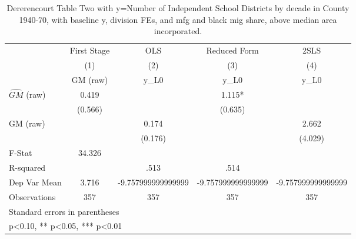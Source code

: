 \begin{table}[htbp]\centering
\def\sym#1{\ifmmode^{#1}\else\(^{#1}\)\fi}
\caption{Dererencourt Table Two with y=Number of Independent School Districts by decade in County 1940-70, with baseline y, division FEs, and mfg and black mig share, above median area incorporated.}
\begin{tabular}{l*{4}{c}}
\toprule
                    & First Stage   &         OLS   &Reduced Form   &        2SLS   \\
                    &\multicolumn{1}{c}{(1)}&\multicolumn{1}{c}{(2)}&\multicolumn{1}{c}{(3)}&\multicolumn{1}{c}{(4)}\\
                    &\multicolumn{1}{c}{GM  (raw)}&\multicolumn{1}{c}{y\_L0}&\multicolumn{1}{c}{y\_L0}&\multicolumn{1}{c}{y\_L0}\\
\midrule
$\hat{GM}$ (raw)    &       0.419   &               &       1.115*  &               \\
                    &     (0.566)   &               &     (0.635)   &               \\
\addlinespace
GM  (raw)           &               &       0.174   &               &       2.662   \\
                    &               &     (0.176)   &               &     (4.029)   \\
\midrule
F-Stat              &      34.326   &               &               &               \\
R-squared           &               &        .513   &        .514   &               \\
Dep Var Mean        &       3.716   &-9.757999999999999   &-9.757999999999999   &-9.757999999999999   \\
Observations        &         357   &         357   &         357   &         357   \\
\bottomrule
\multicolumn{5}{l}{\footnotesize Standard errors in parentheses}\\
\multicolumn{5}{l}{\footnotesize * p<0.10, ** p<0.05, *** p<0.01}\\
\end{tabular}
\end{table}
